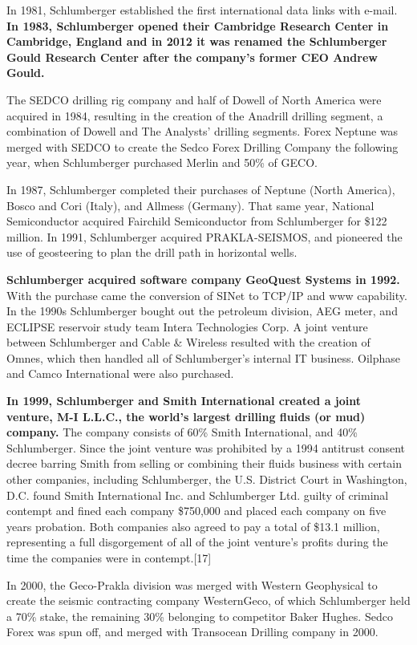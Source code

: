 \documentclass[12pt,a4paper]{article}
\begin{document}
In 1981, Schlumberger established the first international data links with
e-mail. \textbf{In 1983, Schlumberger opened their Cambridge Research Center
  in Cambridge, England and in 2012 it was renamed the Schlumberger Gould
  Research Center after the company's former CEO Andrew Gould.}

The SEDCO drilling rig company and half of Dowell of North America were
acquired in 1984, resulting in the creation of the Anadrill drilling
segment, a combination of Dowell and The Analysts' drilling segments. Forex
Neptune was merged with SEDCO to create the Sedco Forex Drilling Company the
following year, when Schlumberger purchased Merlin and 50\% of GECO.

In 1987, Schlumberger completed their purchases of Neptune (North America),
Bosco and Cori (Italy), and Allmess (Germany). That same year, National
Semiconductor acquired Fairchild Semiconductor from Schlumberger for \$122
million. In 1991, Schlumberger acquired PRAKLA-SEISMOS, and pioneered the
use of geosteering to plan the drill path in horizontal wells.

\textbf{Schlumberger acquired software company GeoQuest Systems in 1992.}
With the purchase came the conversion of SINet to TCP/IP and www capability.
In the 1990s Schlumberger bought out the petroleum division, AEG meter, and
ECLIPSE reservoir study team Intera Technologies Corp. A joint venture
between Schlumberger and Cable \& Wireless resulted with the creation of
Omnes, which then handled all of Schlumberger's internal IT business.
Oilphase and Camco International were also purchased.

\textbf{In 1999, Schlumberger and Smith International created a joint venture, M-I
L.L.C., the world's largest drilling fluids (or mud) company.} The company
consists of 60\% Smith International, and 40\% Schlumberger. Since the joint
venture was prohibited by a 1994 antitrust consent decree barring Smith from
selling or combining their fluids business with certain other companies,
including Schlumberger, the U.S. District Court in Washington, D.C. found
Smith International Inc. and Schlumberger Ltd. guilty of criminal contempt
and fined each company \$750,000 and placed each company on five years
probation. Both companies also agreed to pay a total of \$13.1 million,
representing a full disgorgement of all of the joint venture's profits
during the time the companies were in contempt.[17]

In 2000, the Geco-Prakla division was merged with Western Geophysical to
create the seismic contracting company WesternGeco, of which Schlumberger
held a 70\% stake, the remaining 30\% belonging to competitor Baker Hughes.
Sedco Forex was spun off, and merged with Transocean Drilling company in
2000.
\end{document}
